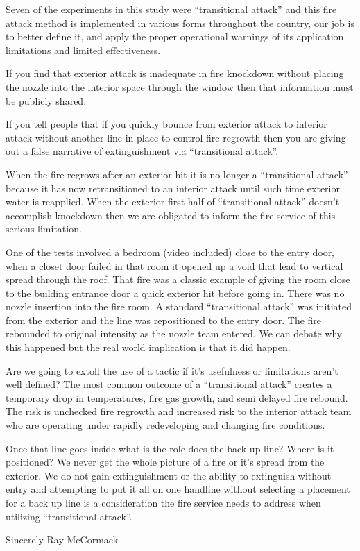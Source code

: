 \documentclass[12pt,oneside]{book}
\begin{document}
\begin{appendix}
Seven of the experiments in this study were ``transitional attack'' and this fire attack method is implemented in various forms throughout the country, our job is to better define it, and apply the proper operational warnings of its application limitations and limited effectiveness.

If you find that exterior attack is inadequate in fire knockdown without placing the nozzle into the interior space through the window then that information must be publicly shared.

If you tell people that if you quickly bounce from exterior attack to interior attack without another line in place to control fire regrowth then you are giving out a false narrative of extinguishment via ``transitional attack''. 

When the fire regrows after an exterior hit it is no longer a ``transitional attack'' because it has now retransitioned to an interior attack until such time exterior water is reapplied. When the exterior first half of ``transitional attack'' doesn't accomplish knockdown then we are obligated to inform the fire service of this serious limitation.

One of the tests involved a bedroom (video included) close to the entry door, when a closet door failed in that room it opened up a void that lead to vertical spread through the roof. That fire was a classic example of giving the room close to the building entrance door a quick exterior hit before going in. There was no nozzle insertion into the fire room. A standard ``transitional attack'' was initiated from the exterior and the line was repositioned to the entry door. The fire rebounded to original intensity as the nozzle team entered. We can debate why this happened but the real world implication is that it did happen.

Are we going to extoll the use of a tactic if it's usefulness or limitations aren't well defined? The most common outcome of a ``transitional attack'' creates a temporary drop in temperatures, fire gas growth, and semi delayed fire rebound. The risk is unchecked fire regrowth and increased risk to the interior attack team who are operating under rapidly redeveloping and changing fire conditions. 

Once that line goes inside what is the role does the back up line? Where is it positioned? We never get the whole picture of a fire or it's spread from the exterior. We do not gain extinguishment or the ability to extinguish without entry and attempting to put it all on one handline without selecting a placement for a back up line is a consideration the fire service needs to address when utilizing ``transitional attack''.

Sincerely
Ray McCormack

\end{appendix}
\end{document}
